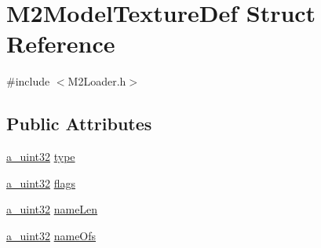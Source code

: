 \hypertarget{struct_m2_model_texture_def}{\section{M2\+Model\+Texture\+Def Struct Reference}
\label{struct_m2_model_texture_def}
}


{\ttfamily \#include $<$M2\+Loader.\+h$>$}

\subsection*{Public Attributes}
\begin{DoxyCompactItemize}
\item 
\hyperlink{_common_defines_8h_a964296f9770051b9e4807b1f180dd416}{a\+\_\+uint32} \hyperlink{struct_m2_model_texture_def_a48a9a4170fdcaf77f4f3d4d6bc911496}{type}
\item 
\hyperlink{_common_defines_8h_a964296f9770051b9e4807b1f180dd416}{a\+\_\+uint32} \hyperlink{struct_m2_model_texture_def_a8c5d43fe326de69d4c6efe75657cac98}{flags}
\item 
\hyperlink{_common_defines_8h_a964296f9770051b9e4807b1f180dd416}{a\+\_\+uint32} \hyperlink{struct_m2_model_texture_def_a5a829c126f9f7c6b01d2bc7cb1c5cbcd}{name\+Len}
\item 
\hyperlink{_common_defines_8h_a964296f9770051b9e4807b1f180dd416}{a\+\_\+uint32} \hyperlink{struct_m2_model_texture_def_a51d3ceb83a5abdcb14928f18f040485e}{name\+Ofs}
\end{DoxyCompactItemize}


